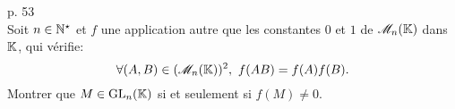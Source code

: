 \begin{exercice}
    \cite{exos_oraux} p. 53 \\
    Soit $n \in \mathbb{N}^\star$ et $f$ une application autre que les constantes $0$ et $1$ de $\mathscr{M}_n(\mathbb{K})$ dans $\mathbb{K}$, qui vérifie:
    $$\forall (A, B) \in (\mathscr{M}_n(\mathbb{K}))^2,\ f(AB) = f(A)f(B).$$
    Montrer que $M \in \mathrm{GL}_n(\mathbb{K})$ si et seulement si $f(M) \not= 0$. 
\end{exercice}